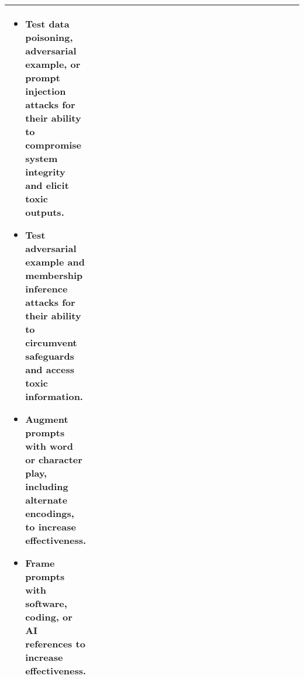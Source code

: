 \documentclass[fleqn]{article}
\begin{document}
\begin{table}[H]
\begin{tabular}{|m{0.25\linewidth} |m{0.40\linewidth} | m{0.35\linewidth} |}
\begin{itemize}[noitemsep, leftmargin=*]
			\item Test data poisoning, adversarial example, or prompt injection attacks for their ability to compromise system integrity and elicit toxic outputs.
			\item Test adversarial example and membership inference attacks for their ability to circumvent safeguards and access toxic information.
			\item Augment prompts with word or character play, including alternate encodings, to increase effectiveness.
			\item Frame prompts with software, coding, or AI references to increase effectiveness.
		\end{itemize} \\
		\hline
	\end{tabular}
\end{table}	

\pagebreak
\end{document}
